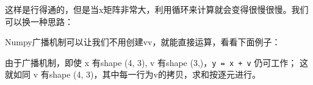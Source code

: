 \begin{frame}
这样是行得通的，但是当x矩阵非常大，利用循环来计算就会变得很慢很慢。我们可以换一种思路：





\end{frame}

\begin{frame}



Numpy广播机制可以让我们不用创建vv，就能直接运算，看看下面例子：






\pause 
由于广播机制，即使 x 有shape (4, 3), v 有shape (3,)，\lstinline|y = x + v| 仍可工作； 这就如同 v 有shape (4, 3)，其中每一行为v的拷贝，求和按逐元进行。

\end{frame}

